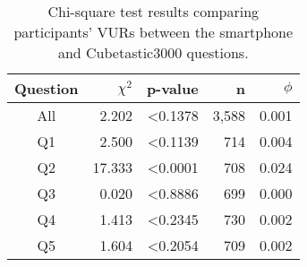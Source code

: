 \begin{table}%
\begin{center}
\begin{tabular}{|c|r|r|r|r|}
\hline
Question & $\chi^2$ & p-value & n & $\phi$ \\
\hline
All & 2.202 & <0.1378 & 3,588 & 0.001\\
Q1 & 2.500 & <0.1139 & 714 & 0.004\\
Q2 & 17.333 & <0.0001 & 708 &  0.024\\
Q3 & 0.020 & <0.8886 & 699 &  0.000\\
Q4 & 1.413 & <0.2345 & 730& 0.002\\
Q5 & 1.604 & <0.2054 & 709 & 0.002\\
\hline
\end{tabular}
\caption{Chi-square test results comparing participants' VURs between the smartphone and Cubetastic3000 questions.}
\label{betweendevice}
\end{center}
\end{table}
						

